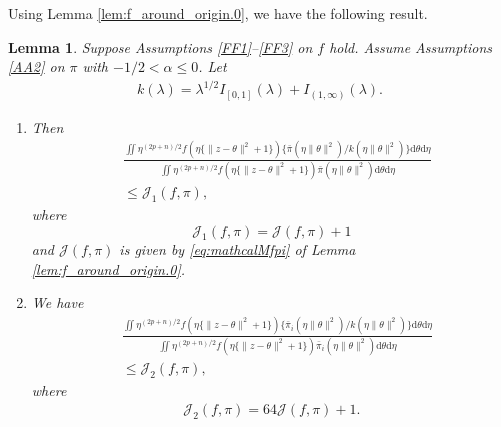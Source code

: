 \documentclass[preprint,11pt]{imsart}
\numberwithin{equation}{section}
\theoremstyle{plain}
\newtheorem{lemma}{Lemma}[section]
\theoremstyle{definition}
\theoremstyle{remark}
\newcommand{\rd}{\mathrm{d}}
\begin{document}
Using Lemma \ref{lem:f_around_origin.0}, we have the following result.
\begin{lemma}\label{lem:f_around_origin}
   Suppose Assumptions \ref{FF1}--\ref{FF3} on $f$ hold.
 Assume Assumptions \ref{AA2} on $\pi$ with $-1/2<\alpha\leq 0$.
 Let 
\begin{align*}
 k(\lambda)=\lambda^{1/2}I_{[0,1]}(\lambda)+ I_{(1,\infty)}(\lambda).
\end{align*}
\begin{enumerate}
 \item\label{lem:f_around_origin.part.1} Then 
\begin{equation}\label{eq:lem:f_around_origin.part.1}
 \begin{split}
  & \frac{ \iint   \eta^{(2p+n)/2} f(\eta\{\|z-\theta\|^2+1\})
  \{\bar{\pi}(\eta\|\theta\|^2)/k(\eta\|\theta\|^2)\} \rd \theta   \rd \eta}
 {\iint  \eta^{(2p+n)/2} f(\eta\{\|z-\theta\|^2+1\}) \bar{\pi}(\eta\|\theta\|^2) \rd \theta   \rd \eta}\\
&\leq \mathcal{J}_1(f,\pi),
 \end{split}
\end{equation} 
 where 
\begin{equation}
\mathcal{J}_1(f,\pi)=\mathcal{J}(f,\pi)+1
\end{equation}
and $\mathcal{J}(f,\pi)$ is given by \eqref{eq:mathcalMfpi} of Lemma \ref{lem:f_around_origin.0}.
 \item\label{lem:f_around_origin.part.2}  We have
\begin{equation}\label{eq:lem:f_around_origin.part.2}
 \begin{split}
  & \frac{ \iint   \eta^{(2p+n)/2} f(\eta\{\|z-\theta\|^2+1\})
  \{\bar{\pi}_i(\eta\|\theta\|^2)/k(\eta\|\theta\|^2)\} \rd \theta   \rd \eta}
 {\iint  \eta^{(2p+n)/2} f(\eta\{\|z-\theta\|^2+1\}) \bar{\pi}_i(\eta\|\theta\|^2) \rd \theta   \rd \eta} \\
&\leq \mathcal{J}_2(f,\pi),
\end{split}
\end{equation}
 where
 \begin{align*}
  \mathcal{J}_2(f,\pi)=64\mathcal{J}(f,\pi)+1.
 \end{align*}
\end{enumerate}
\end{lemma}
\end{document}
